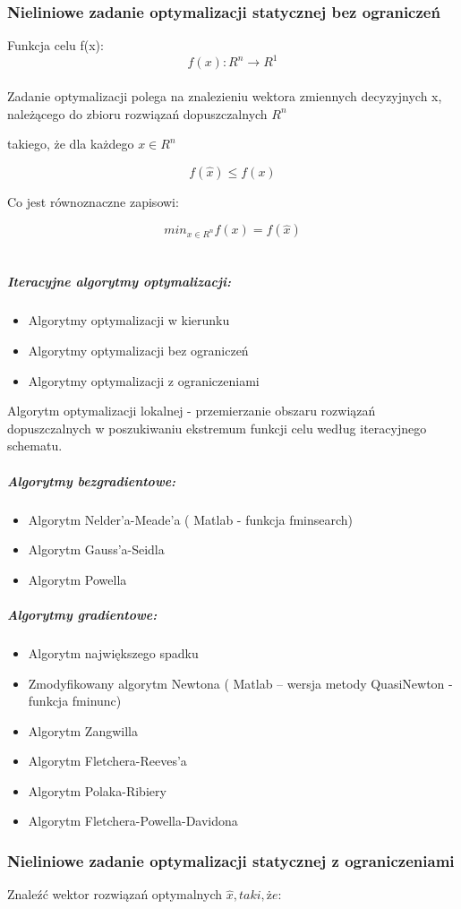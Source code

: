\documentclass[a4paper,twoside]{report}
\begin{document}
\subsubsection{Nieliniowe zadanie optymalizacji statycznej bez ograniczeń}


Funkcja celu f(x):
$$f(x):R^n \longrightarrow R^1$$
\\
Zadanie optymalizacji polega na znalezieniu wektora zmiennych decyzyjnych x, należącego do zbioru rozwiązań dopuszczalnych $R^n$

takiego, że dla każdego $ x \in R^n $


$$ f(\hat{x})\le f(x) $$

Co jest równoznaczne zapisowi:

$$min_{x \in R^n} f(x) = f(\hat{x})$$
\\
\subparagraph{Iteracyjne algorytmy optymalizacji:}
\begin{itemize}
\item Algorytmy optymalizacji w kierunku
\item Algorytmy optymalizacji bez ograniczeń
\item Algorytmy optymalizacji z ograniczeniami
\end{itemize}
Algorytm optymalizacji lokalnej - przemierzanie obszaru rozwiązań dopuszczalnych w poszukiwaniu ekstremum funkcji celu według iteracyjnego schematu.

\subparagraph{Algorytmy bezgradientowe:}
\begin{itemize}
\item Algorytm Nelder’a-Meade’a ( Matlab - funkcja fminsearch)
\item Algorytm Gauss’a-Seidla
\item Algorytm Powella 
\end{itemize}

\subparagraph{Algorytmy gradientowe:}
\begin{itemize}
\item Algorytm największego spadku
\item Zmodyfikowany algorytm Newtona ( Matlab – wersja metody QuasiNewton
- funkcja fminunc)
\item Algorytm Zangwilla
\item Algorytm Fletchera-Reeves’a
\item Algorytm Polaka-Ribiery
\item Algorytm Fletchera-Powella-Davidona
\end{itemize}


\subsubsection{Nieliniowe zadanie optymalizacji statycznej z ograniczeniami}
Znaleźć wektor rozwiązań optymalnych $\hat{x}, taki, że:$
\end{document}
